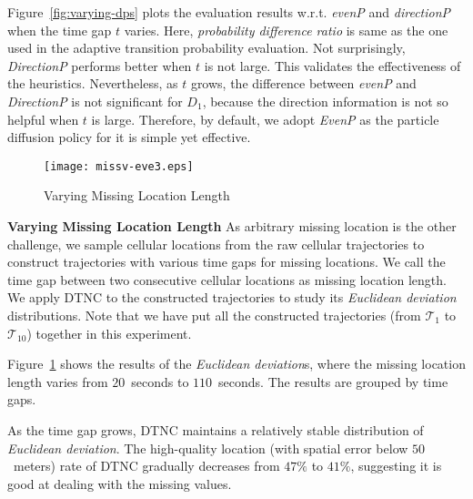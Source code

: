 \documentclass{vldb}
\begin{document}
	Figure~\ref{fig:varying-dps} plots the evaluation results w.r.t. {\em evenP} and {\em directionP} when the time gap $t$ varies.
	Here, {\em probability difference ratio} is same as the one used in the adaptive transition probability evaluation.
	Not surprisingly, {\em DirectionP} performs better when $t$ is not large.
	This validates the effectiveness of the heuristics.
	Nevertheless, as $t$ grows, the difference between {\em evenP} and {\em DirectionP} is not significant for $D_1$, because the direction information is not so helpful when $t$ is large.
	Therefore, by default, we adopt {\em EvenP} as the particle diffusion policy for it is simple yet effective.
	
	
	
	\begin{figure}
		\texttt{[image: missv-eve3.eps]}
		\caption{Varying Missing Location Length}
		\label{fig:eff-acc-varying-time}
	\end{figure}
	
	\textbf{Varying Missing Location Length}
		As arbitrary missing location is the other challenge, %
		we sample cellular locations from the raw cellular trajectories to construct trajectories with various time gaps for missing locations.
		We call the time gap between two consecutive cellular locations as missing location length.
		We apply DTNC to the constructed trajectories to study its {\em Euclidean deviation} distributions.
		Note that we have put all the constructed trajectories (from $\mathcal{T}_1$ to $\mathcal{T}_{10}$) together in this experiment.
		
		Figure~\ref{fig:eff-acc-varying-time} shows the results of the {\em Euclidean deviation}s, where the missing location length varies from $20$~seconds to $110$~seconds.
		The results are grouped by time gaps.
		
		As the time gap grows, DTNC maintains a relatively stable distribution of {\em Euclidean deviation}. 
		The high-quality location (with spatial error below $50$~meters) rate of DTNC gradually decreases from $47\%$ to $41\%$, suggesting it is good at dealing with the missing values.
		
\end{document}
